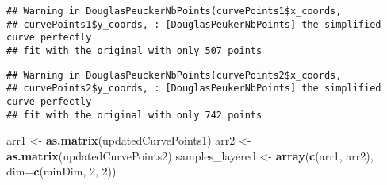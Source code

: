 \documentclass[
]{article}
\newenvironment{Shaded}{\begin{snugshade}}{\end{snugshade}}
\newcommand{\DataTypeTok}[1]{\textcolor[rgb]{0.13,0.29,0.53}{#1}}
\newcommand{\DecValTok}[1]{\textcolor[rgb]{0.00,0.00,0.81}{#1}}
\newcommand{\KeywordTok}[1]{\textcolor[rgb]{0.13,0.29,0.53}{\textbf{#1}}}
\newcommand{\NormalTok}[1]{#1}
\newcommand{\OperatorTok}[1]{\textcolor[rgb]{0.81,0.36,0.00}{\textbf{#1}}}
\newcommand{\OtherTok}[1]{\textcolor[rgb]{0.56,0.35,0.01}{#1}}
\newcommand{\StringTok}[1]{\textcolor[rgb]{0.31,0.60,0.02}{#1}}
\begin{document}
\begin{verbatim}
## Warning in DouglasPeuckerNbPoints(curvePoints1$x_coords,
## curvePoints1$y_coords, : [DouglasPeukerNbPoints] the simplified curve perfectly
## fit with the original with only 507 points
\end{verbatim}

\begin{Shaded}
\end{Shaded}

\begin{verbatim}
## Warning in DouglasPeuckerNbPoints(curvePoints2$x_coords,
## curvePoints2$y_coords, : [DouglasPeukerNbPoints] the simplified curve perfectly
## fit with the original with only 742 points
\end{verbatim}

\begin{Shaded}
\begin{Highlighting}[]
\NormalTok{arr1 <-}\StringTok{ }\KeywordTok{as.matrix}\NormalTok{(updatedCurvePoints1)}
\NormalTok{arr2 <-}\StringTok{ }\KeywordTok{as.matrix}\NormalTok{(updatedCurvePoints2)}
\NormalTok{samples_layered <-}\StringTok{ }\KeywordTok{array}\NormalTok{(}\KeywordTok{c}\NormalTok{(arr1, arr2), }\DataTypeTok{dim=}\KeywordTok{c}\NormalTok{(minDim, }\DecValTok{2}\NormalTok{, }\DecValTok{2}\NormalTok{))}
\end{Highlighting}
\end{Shaded}

\begin{Shaded}
\end{Shaded}
\end{document}
